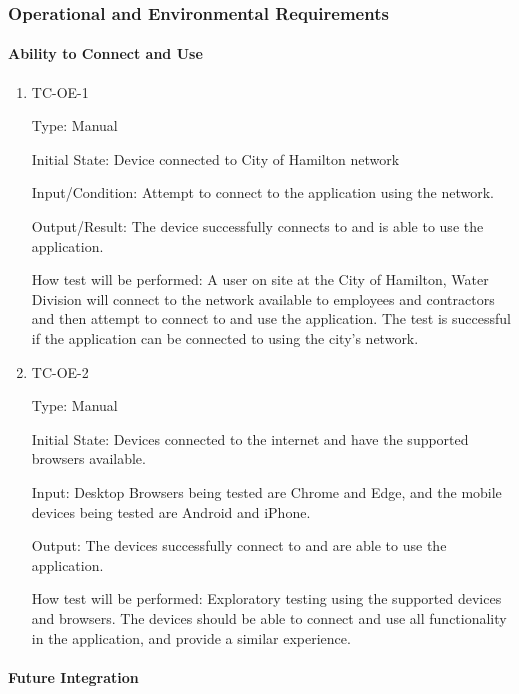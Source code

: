 \documentclass[12pt, titlepage]{article}
\begin{document}
\subsubsection{Operational and Environmental Requirements}

\paragraph{Ability to Connect and Use}

\begin{enumerate}

  \item{TC-OE-1\\}

    Type: Manual

    Initial State: Device connected to City of Hamilton network

    Input/Condition: Attempt to connect to the application using the network.

    Output/Result: The device successfully connects to and is able to
    use the application.

    How test will be performed: A user on site at the City of
    Hamilton, Water Division will connect to the network available to
    employees and contractors and then attempt to connect to and use
    the application. The test is successful if the application can be
    connected to using the city's network.

  \item{TC-OE-2\\}

    Type: Manual

    Initial State: Devices connected to the internet and have the
    supported browsers available.

    Input: Desktop Browsers being tested are Chrome and Edge, and the
    mobile devices being tested are Android and iPhone.

    Output: The devices successfully connect to and are able to use
    the application.

    How test will be performed: Exploratory testing using the
    supported devices and browsers. The devices should be able to
    connect and use all functionality in the application, and provide
    a similar experience.

\end{enumerate}

\paragraph{Future Integration}
\end{document}
